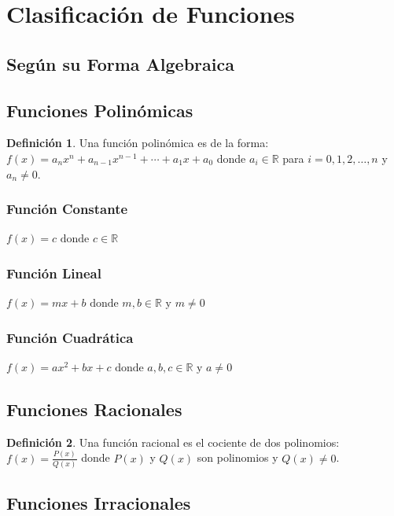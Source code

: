 \documentclass[12pt, a4paper, oneside]{book}
\theoremstyle{definition}
\newtheorem{definicion}{Definición}[chapter]
\begin{document}
\section{Clasificación de Funciones}

\subsection{Según su Forma Algebraica}

\subsection{Funciones Polinómicas}

\begin{definicion}
Una función polinómica es de la forma:
$f(x) = a_n x^n + a_{n-1} x^{n-1} + \cdots + a_1 x + a_0$
donde $a_i \in \mathbb{R}$ para $i = 0, 1, 2, \ldots, n$ y $a_n \neq 0$.
\end{definicion}

\subsubsection{Función Constante}
$f(x) = c \text{ donde } c \in \mathbb{R}$

\subsubsection{Función Lineal}
$f(x) = mx + b \text{ donde } m, b \in \mathbb{R} \text{ y } m \neq 0$

\subsubsection{Función Cuadrática}
$f(x) = ax^2 + bx + c \text{ donde } a, b, c \in \mathbb{R} \text{ y } a \neq 0$

\subsection{Funciones Racionales}

\begin{definicion}
Una función racional es el cociente de dos polinomios:
$f(x) = \frac{P(x)}{Q(x)}$
donde $P(x)$ y $Q(x)$ son polinomios y $Q(x) \neq 0$.
\end{definicion}

\subsection{Funciones Irracionales}
\end{document}
